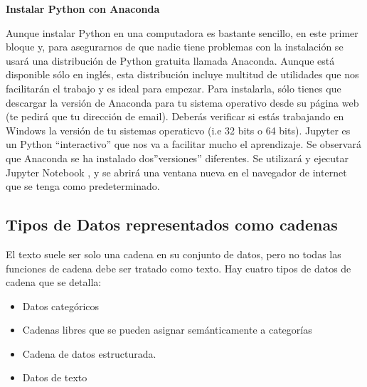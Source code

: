 \documentclass[12pt, runningheads,a4]{book}
\begin{document}
\vskip 0.2cm

\textbf{Instalar Python con Anaconda}

\vskip 0.2cm

Aunque instalar Python en una computadora es bastante sencillo, en este primer bloque y, para asegurarnos de que nadie tiene problemas con la instalación se usará una distribución de Python gratuita llamada Anaconda. Aunque está disponible sólo en inglés, esta distribución incluye multitud de utilidades que nos facilitarán el trabajo y es ideal para empezar. Para instalarla, sólo tienes que descargar la versión de Anaconda para tu sistema operativo desde su página web (te pedirá que tu dirección de email).
Deberás verificar si estás trabajando en Windows la versión de tu sistemas operaticvo (i.e 32 bits o 64 bits).
Jupyter es un Python “interactivo” que nos va a facilitar mucho el aprendizaje. Se observará que Anaconda se ha instalado dos”versiones” diferentes. 
Se utilizará  y ejecutar Jupyter Notebook , y se abrirá una ventana nueva en el navegador de internet que se tenga como predeterminado.

\subsection{Tipos de Datos representados como cadenas}
El texto suele ser solo una cadena en su conjunto de datos, pero no todas las funciones de cadena debe ser tratado como texto.
Hay cuatro tipos de datos de cadena que se  detalla:
\begin{itemize}
	\item Datos categóricos
	\item Cadenas libres que se pueden asignar semánticamente a categorías
	\item Cadena de datos estructurada.
	\item Datos de texto
\end{itemize}
\end{document}
